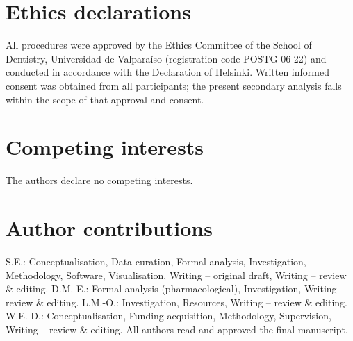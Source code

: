 \section*{Ethics declarations}
All procedures were approved by the Ethics Committee of the School of Dentistry,
Universidad de Valpara\'{i}so (registration code POSTG-06-22) and conducted in
accordance with the Declaration of Helsinki.
Written informed consent was obtained from all participants; the present
secondary analysis falls within the scope of that approval and consent.

\section*{Competing interests}
The authors declare no competing interests.

\section*{Author contributions}
S.E.: Conceptualisation, Data curation, Formal analysis, Investigation,
Methodology, Software, Visualisation, Writing -- original draft,
Writing -- review \& editing.
D.M.-E.: Formal analysis (pharmacological), Investigation, Writing -- review
\& editing.
L.M.-O.: Investigation, Resources, Writing -- review \& editing.
W.E.-D.: Conceptualisation, Funding acquisition, Methodology, Supervision,
Writing -- review \& editing.
All authors read and approved the final manuscript.

